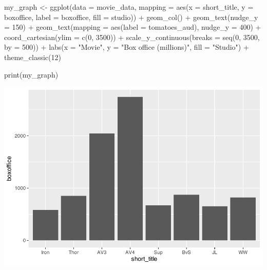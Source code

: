 \documentclass[
]{krantz}
\makeatletter
\newenvironment{Shaded}{\begin{snugshade}}{\end{snugshade}}
\newcommand{\AttributeTok}[1]{\textcolor[rgb]{0.61,0.61,0.61}{#1}}
\newcommand{\DecValTok}[1]{\textcolor[rgb]{0.06,0.06,0.06}{#1}}
\newcommand{\FunctionTok}[1]{\textcolor[rgb]{0,0,0}{#1}}
\newcommand{\NormalTok}[1]{#1}
\newcommand{\OtherTok}[1]{\textcolor[rgb]{0.37,0.37,0.37}{#1}}
\newcommand{\SpecialCharTok}[1]{\textcolor[rgb]{0,0,0}{#1}}
\newcommand{\StringTok}[1]{\textcolor[rgb]{0.5,0.5,0.5}{#1}}
\newenvironment{kframe}{%
\medskip{}
\setlength{\fboxsep}{.8em}
 \def\at@end@of@kframe{}%
 \ifinner\ifhmode%
  \def\at@end@of@kframe{\end{minipage}}%
  \begin{minipage}{\columnwidth}%
 \fi\fi%
 \def\FrameCommand##1{\hskip\@totalleftmargin \hskip-\fboxsep
 \colorbox{shadecolor}{##1}\hskip-\fboxsep
     \hskip-\linewidth \hskip-\@totalleftmargin \hskip\columnwidth}%
 \MakeFramed {\advance\hsize-\width
   \@totalleftmargin\z@ \linewidth\hsize
   \@setminipage}}%
 {\par\unskip\endMakeFramed%
 \at@end@of@kframe}
\renewenvironment{Shaded}{\begin{kframe}}{\end{kframe}}
\makeatother
\begin{document}
\begin{Shaded}
\begin{Highlighting}[]
\NormalTok{my\_graph }\OtherTok{\textless{}{-}} \FunctionTok{ggplot}\NormalTok{(}\AttributeTok{data =}\NormalTok{ movie\_data,}
           \AttributeTok{mapping =} \FunctionTok{aes}\NormalTok{(}\AttributeTok{x =}\NormalTok{ short\_title,}
                         \AttributeTok{y =}\NormalTok{ boxoffice,}
                         \AttributeTok{label =}\NormalTok{ boxoffice, }
                         \AttributeTok{fill =}\NormalTok{ studio)) }\SpecialCharTok{+}
  \FunctionTok{geom\_col}\NormalTok{() }\SpecialCharTok{+}
  \FunctionTok{geom\_text}\NormalTok{(}\AttributeTok{nudge\_y =} \DecValTok{150}\NormalTok{)  }\SpecialCharTok{+}
  \FunctionTok{geom\_text}\NormalTok{(}\AttributeTok{mapping =} \FunctionTok{aes}\NormalTok{(}\AttributeTok{label =}\NormalTok{ tomatoes\_aud), }
            \AttributeTok{nudge\_y =} \DecValTok{400}\NormalTok{) }\SpecialCharTok{+}
  \FunctionTok{coord\_cartesian}\NormalTok{(}\AttributeTok{ylim =} \FunctionTok{c}\NormalTok{(}\DecValTok{0}\NormalTok{, }\DecValTok{3500}\NormalTok{)) }\SpecialCharTok{+}
  \FunctionTok{scale\_y\_continuous}\NormalTok{(}\AttributeTok{breaks =} \FunctionTok{seq}\NormalTok{(}\DecValTok{0}\NormalTok{, }\DecValTok{3500}\NormalTok{, }\AttributeTok{by =} \DecValTok{500}\NormalTok{)) }\SpecialCharTok{+}
  \FunctionTok{labs}\NormalTok{(}\AttributeTok{x =} \StringTok{"Movie"}\NormalTok{,}
       \AttributeTok{y =} \StringTok{"Box office (millions)"}\NormalTok{,}
       \AttributeTok{fill =} \StringTok{"Studio"}\NormalTok{) }\SpecialCharTok{+}
  \FunctionTok{theme\_classic}\NormalTok{(}\DecValTok{12}\NormalTok{)}

\FunctionTok{print}\NormalTok{(my\_graph)}
\end{Highlighting}
\end{Shaded}

\includegraphics[width=0.65\linewidth]{bookdown_files/figure-latex/unnamed-chunk-114-1}
\end{document}
